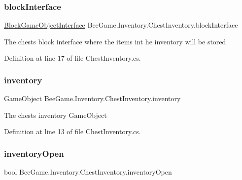 \subsubsection{\texorpdfstring{block\+Interface}{blockInterface}}
{\footnotesize\ttfamily \hyperlink{class_bee_game_1_1_blocks_1_1_block_game_object_interface}{Block\+Game\+Object\+Interface} Bee\+Game.\+Inventory.\+Chest\+Inventory.\+block\+Interface\hspace{0.3cm}{\ttfamily [protected]}}



The chests block interface where the items int he inventory will be stored 



Definition at line 17 of file Chest\+Inventory.\+cs.

\mbox{\label{class_bee_game_1_1_inventory_1_1_chest_inventory_ac6fe8eed65557a7eb99e56d201c55466}} 
\subsubsection{\texorpdfstring{inventory}{inventory}}
{\footnotesize\ttfamily Game\+Object Bee\+Game.\+Inventory.\+Chest\+Inventory.\+inventory}



The chests inventory Game\+Object 



Definition at line 13 of file Chest\+Inventory.\+cs.

\mbox{\label{class_bee_game_1_1_inventory_1_1_chest_inventory_a3e3529178934f2a4a8e91529c148457c}} 
\subsubsection{\texorpdfstring{inventory\+Open}{inventoryOpen}}
{\footnotesize\ttfamily bool Bee\+Game.\+Inventory.\+Chest\+Inventory.\+inventory\+Open\hspace{0.3cm}{\ttfamily [private]}}




